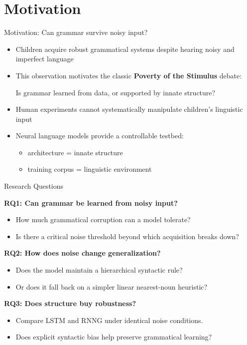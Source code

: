\section{Motivation}


\begin{frame}{Motivation: Can grammar survive noisy input?}
\begin{itemize}
\item Children acquire robust grammatical systems despite hearing noisy and imperfect language
\item This observation motivates the classic \textbf{Poverty of the Stimulus} debate:

      Is grammar learned from data, or supported by innate structure?
\item Human experiments cannot systematically manipulate children's linguistic input
\item Neural language models provide a controllable testbed:
\begin{itemize}
\item architecture = innate structure
\item training corpus = linguistic environment
\end{itemize}

\end{itemize}

\end{frame}


\begin{frame}{Research Questions}

\textbf{RQ1: Can grammar be learned from noisy input?}

\begin{itemize}
    \item How much grammatical corruption can a model tolerate?
    \item Is there a critical noise threshold beyond which acquisition breaks down?
\end{itemize}


\textbf{RQ2: How does noise change generalization?}

\begin{itemize}
    \item Does the model maintain a hierarchical syntactic rule?
    \item Or does it fall back on a simpler linear nearest-noun heuristic?
\end{itemize}


\textbf{RQ3: Does structure buy robustness?}

\begin{itemize}
    \item Compare LSTM and RNNG under identical noise conditions.
    \item Does explicit syntactic bias help preserve grammatical learning?
\end{itemize}

\end{frame}
